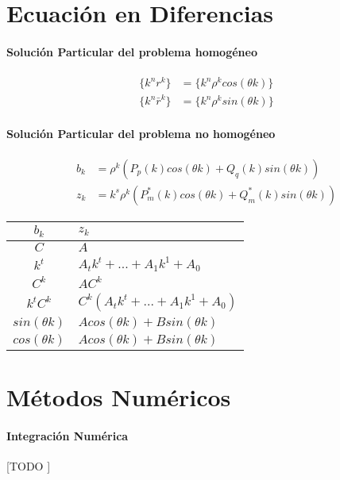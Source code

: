 \documentclass{article}
\begin{document}
\begin{multicols}{2}
    \section{Ecuación en Diferencias}

      \paragraph{Solución Particular del problema homogéneo}

        \begin{align*}
          \{k^nr^k \}&= \{k^n\rho^k cos(\theta k)\}\\
          \{k^n\bar{r}^k \} &=\{k^n\rho^k sin(\theta k)\}
        \end{align*}

      \paragraph{Solución Particular del problema no homogéneo}

        \begin{align*}
          b_k &= \rho^k(P_p(k) cos(\theta k) + Q_q(k) sin(\theta k ))\\
          z_k &= k^s\rho^k(P^*_m(k) cos(\theta k) + Q^*_m(k) sin(\theta k ))
        \end{align*}

        \begin{tabular}{c | l}
          $b_k$ & $z_k$ \\ \hline
          $C$ & $A$ \\
          $k^t$ & $A_tk^t + ... + A_1k^1 + A_0$ \\
          $C^k$ & $AC^k$ \\
          $k^tC^k$ & $C^k(A_tk^t + ... + A_1k^1 + A_0)$\\
          $sin(\theta k)$ & $Acos(\theta k) + Bsin(\theta k)$ \\
          $cos(\theta k)$ & $Acos(\theta k) + Bsin(\theta k)$
        \end{tabular}


    \section{Métodos Numéricos}

      \paragraph{Integración Numérica}
      [TODO ]


\end{multicols}
\end{document}
